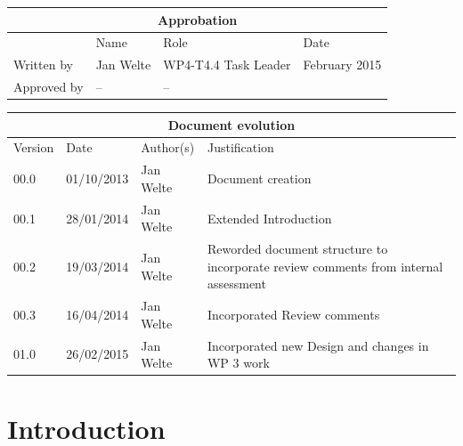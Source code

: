 \documentclass{template/openetcs_report}
\begin{document}
\begin{tabular}{|p{2.2cm}|p{4cm}|p{4cm}|p{2cm}|}
\hline
\multicolumn{4}{|c|}{Approbation} \\
\hline
  &  Name & Role & Date   \\
\hline  
Written by    &  Jan Welte & WP4-T4.4 Task Leader  &  February 2015\\
\hline
Approved by & -- & -- & \\
\hline
\end{tabular}

\begin{tabular}{|p{2.2cm}|p{2cm}|p{3cm}|p{5cm}|}
\hline
\multicolumn{4}{|c|}{Document evolution} \\
\hline
Version &  Date & Author(s) & Justification  \\
\hline
00.0 & 01/10/2013 & Jan Welte &  Document creation \\
\hline  
00.1 & 28/01/2014 & Jan Welte &  Extended Introduction  \\
00.2 & 19/03/2014 & Jan Welte &  Reworded document structure to incorporate review comments from internal assessment \\
00.3 & 16/04/2014 & Jan Welte &  Incorporated Review comments \\
01.0 & 26/02/2015 & Jan Welte &  Incorporated new Design and changes in WP 3 work \\
\hline  
\end{tabular}
\newpage


\mainmatter

\chapter{Introduction}
\label{sec:introduction}
\end{document}
